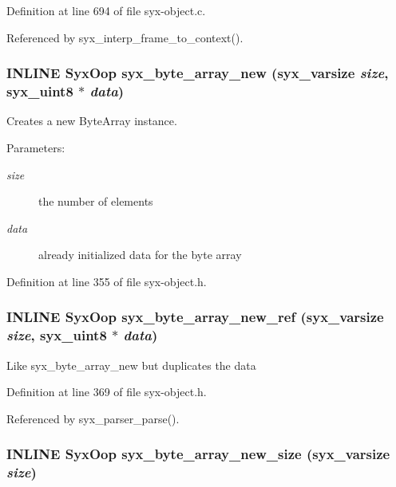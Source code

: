 Definition at line 694 of file syx-object.c.

Referenced by syx\_\-interp\_\-frame\_\-to\_\-context().\hypertarget{syx-object_8h_637a68800765eeec4dcc041b9e2c51db}{
\subsubsection{\setlength{\rightskip}{0pt plus 5cm}INLINE {\bf SyxOop} syx\_\-byte\_\-array\_\-new ({\bf syx\_\-varsize} {\em size}, \/  {\bf syx\_\-uint8} $\ast$ {\em data})}}
\label{syx-object_8h_637a68800765eeec4dcc041b9e2c51db}


Creates a new ByteArray instance.

\begin{Desc}
\item[Parameters:]
\begin{description}
\item[{\em size}]the number of elements \item[{\em data}]already initialized data for the byte array \end{description}
\end{Desc}


Definition at line 355 of file syx-object.h.\hypertarget{syx-object_8h_0212b76e62e1e054559a7155504ff25e}{
\subsubsection{\setlength{\rightskip}{0pt plus 5cm}INLINE {\bf SyxOop} syx\_\-byte\_\-array\_\-new\_\-ref ({\bf syx\_\-varsize} {\em size}, \/  {\bf syx\_\-uint8} $\ast$ {\em data})}}
\label{syx-object_8h_0212b76e62e1e054559a7155504ff25e}


Like syx\_\-byte\_\-array\_\-new but duplicates the data 

Definition at line 369 of file syx-object.h.

Referenced by syx\_\-parser\_\-parse().\hypertarget{syx-object_8h_7ef9b6014138610515cd6924192b1de2}{
\subsubsection{\setlength{\rightskip}{0pt plus 5cm}INLINE {\bf SyxOop} syx\_\-byte\_\-array\_\-new\_\-size ({\bf syx\_\-varsize} {\em size})}}
\label{syx-object_8h_7ef9b6014138610515cd6924192b1de2}


